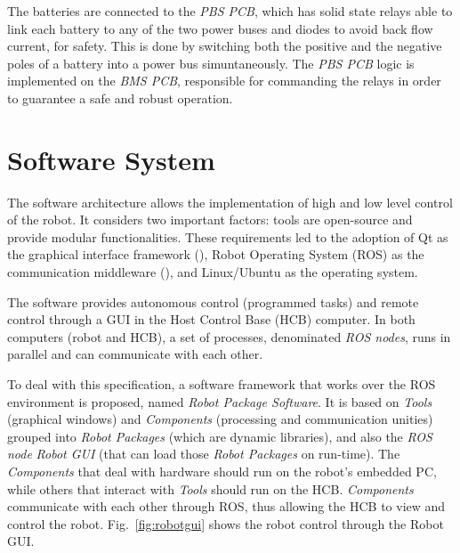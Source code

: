 \documentclass{ifacconf}
\begin{document}
The batteries are connected to the \emph{PBS PCB}, which has solid
state relays able to link each battery to any of the two power buses and diodes
to avoid back flow current, for safety. This is done by switching both the
positive and the negative poles of a battery into a power bus simuntaneously.
The \emph{PBS PCB} logic is implemented on the \emph{BMS PCB}, responsible for
commanding the relays in order to guarantee a safe and robust
operation. 





\section{Software System}\label{sec:software}

The software architecture allows the implementation of high and low level
control of the robot. It considers two important factors: tools are open-source
and provide modular functionalities. These requirements led to the adoption of
Qt as the graphical interface framework (\cite{qt}), Robot Operating System
(ROS) as the communication middleware (\cite{ros}), and Linux/Ubuntu as the
operating system.

The software provides autonomous control (programmed tasks) and remote control
through a GUI in the Host Control Base (HCB)
computer. In both computers (robot and HCB), a set of processes, denominated \emph{ROS
nodes}, runs in parallel and can communicate with each other.

To deal with this specification, a software framework that works over the ROS
environment is proposed, named \emph{Robot Package Software}. It is based on
\emph{Tools} (graphical windows) and \emph{Components} (processing and
communication unities) grouped into \emph{Robot Packages} (which are dynamic
libraries), and also the \emph{ROS node} \emph{Robot GUI} (that can load those
\emph{Robot Packages} on run-time). The \emph{Components} that deal
with hardware should run on the robot's embedded PC, while others that interact
with \emph{Tools} should run on the HCB. \emph{Components} communicate with each
other through ROS, thus allowing the HCB to view and control the robot.
Fig.~\ref{fig:robotgui} shows the robot control through the Robot GUI.
\end{document}
